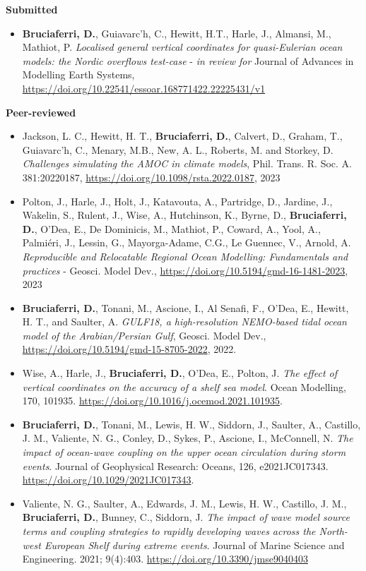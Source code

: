 \documentclass[a4paper, oneside, final]{scrartcl}
\begin{document}

\textbf{Submitted}
\begin{itemize}
\item \textbf{Bruciaferri, D.}, Guiavarc'h, C., Hewitt, H.T., Harle, J., Almansi, M., Mathiot, P. \textit{Localised general vertical coordinates for quasi-Eulerian ocean models: the Nordic overflows test-case} - \textit{in review for} Journal of Advances in Modelling Earth Systems, \url{https://doi.org/10.22541/essoar.168771422.22225431/v1}	
\end{itemize}	
\noindent
\textbf{Peer-reviewed}
\begin{itemize}
\item Jackson, L. C., Hewitt, H. T., \textbf{Bruciaferri, D.}, Calvert, D., Graham, T., Guiavarc’h, C., Menary, M.B., New, A. L., Roberts, M. and Storkey, D. \textit{Challenges simulating the AMOC in climate models}, Phil. Trans. R. Soc. A. 381:20220187, \url{https://doi.org/10.1098/rsta.2022.0187}, 2023	
\item Polton, J., Harle, J., Holt, J., Katavouta, A., Partridge, D., Jardine, J., Wakelin, S., Rulent, J., Wise, A., Hutchinson, K., Byrne, D., \textbf{Bruciaferri, D.}, O'Dea, E., De Dominicis, M., Mathiot, P., Coward, A., Yool, A., Palmiéri, J., Lessin, G., Mayorga-Adame, C.G., Le Guennec, V., Arnold, A. \textit{Reproducible and Relocatable Regional Ocean Modelling: Fundamentals and practices} - Geosci. Model Dev., \url{https://doi.org/10.5194/gmd-16-1481-2023}, 2023
\item \textbf{Bruciaferri, D.}, Tonani, M., Ascione, I., Al Senafi, F., O'Dea, E., Hewitt, H. T., and Saulter, A. \textit{GULF18, a high-resolution NEMO-based tidal ocean model of the Arabian/Persian Gulf}, Geosci. Model Dev., \url{https://doi.org/10.5194/gmd-15-8705-2022}, 2022.
\item Wise, A., Harle, J., \textbf{Bruciaferri, D.}, O'Dea, E., Polton, J. \textit{The effect of vertical coordinates on the accuracy of a shelf sea model}. Ocean Modelling, 170, 101935. \url{https://doi.org/10.1016/j.ocemod.2021.101935}.	
\item \textbf{Bruciaferri, D.}, Tonani, M., Lewis, H. W., Siddorn, J., Saulter, A., Castillo, J. M., Valiente, N. G., Conley, D., Sykes, P., Ascione, I., McConnell, N. \textit{The impact of ocean-wave coupling on the upper ocean circulation during storm events}. Journal of Geophysical Research: Oceans, 126, e2021JC017343. \url{https://doi.org/10.1029/2021JC017343}.
\item Valiente, N. G., Saulter, A., Edwards, J. M., Lewis, H. W., Castillo, J. M., \textbf{Bruciaferri, D.}, Bunney, C., Siddorn, J. \textit{The impact of wave model source terms and coupling strategies to rapidly developing waves across the North-west European Shelf during extreme events}. Journal of Marine Science and Engineering. 2021; 9(4):403. \url{https://doi.org/10.3390/jmse9040403}	

\end{itemize}
\end{document}
